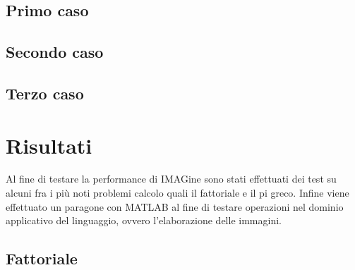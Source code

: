 \documentclass[10pt]{article}
\begin{document}
\subsection{Primo caso}

\clearpage
\subsection{Secondo caso}

\clearpage
\subsection{Terzo caso}





\clearpage
\section{Risultati}
Al fine di testare la performance di IMAGine sono stati effettuati dei test su alcuni fra i più noti problemi calcolo quali il fattoriale e il pi greco. Infine viene effettuato un paragone con MATLAB al fine di testare operazioni nel dominio applicativo del linguaggio, ovvero l'elaborazione delle immagini.

\subsection{Fattoriale}




\end{document}

